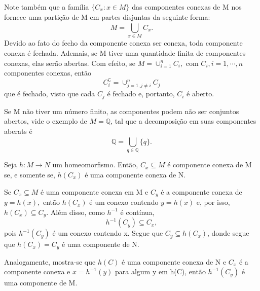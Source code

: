 \documentclass[MetricSpaces/metric_notes.tex]{subfiles}
\begin{document}
Note também que a família \(\{C_{x}: x\in M\}\) das componentes conexas de M nos fornece uma partição de M
em partes disjuntas da seguinte forma:
\[
	M = \bigcup_{x\in M}^{}{C_{x}}.
\]
Devido ao fato do fecho da componente conexa ser conexa, toda componente conexa é fechada. Ademais, se M tiver uma quantidade finita de componentes conexas,
elas serão abertas. Com efeito, se \(M = \cup_{i=1}^{n}C_{i},\) com \(C_{i}, i = 1,\cdots,n\) componentes conexas, então
\[
	C_{i}^{\complement} = \cup_{j=1, j\neq i}^{n}C_{j}
\]
que é fechado, visto que cada \(C_{j}\) é fechado e, portanto, \(C_{i}\) é aberto.
\begin{example}
	Se M não tiver um número finito, as componentes podem não ser conjuntos abertos, vide o exemplo de \(M = \mathbb{Q}\), tal que a decomposição em suas componentes aberats é
	\[
		\mathbb{Q} = \bigcup_{q\in \mathbb{Q}}^{}{\{q\}}.
	\]
\end{example}
\begin{theorem*}
	Seja \(h:M\rightarrow N\) um homeomorfismo. Então, \(C_{x}\subseteq{M}\) é componente conexa de M se, e somente se,
	\(h(C_{x})\) é uma componente conexa de N.
\end{theorem*}
\begin{proof*}
	Se \(C_{x}\subseteq{M}\) é uma componente conexa em M e \(C_{y}\) é a componente conexa de \(y=h(x),\) então \(h(C_{x})\) é
	um conexo contendo \(y = h(x)\) e, por isso, \(h(C_{x})\subseteq{C_{y}}\). Além disso, como \(h^{-1}\) é contínua,
	\[
		h^{-1}(C_{y})\subseteq{C_{x}},
	\]
	pois \(h^{-1}(C_{y})\) é um conexo contendo x. Segue que \(C_{y}\subseteq{h(C_{x})}\), donde segue que \(h(C_{x}) = C_{y}\) é
	uma componente de N.

	Analogamente, mostra-se que \(h(C)\) é uma componente conexa de N e \(C_{x}\) é a componente conexa e \(x=h^{-1}(y)\) para algum y em h(C), então
	\(h^{-1}(C_{y})\) é uma componente de M. \qedsymbol
\end{proof*}
\end{document}
